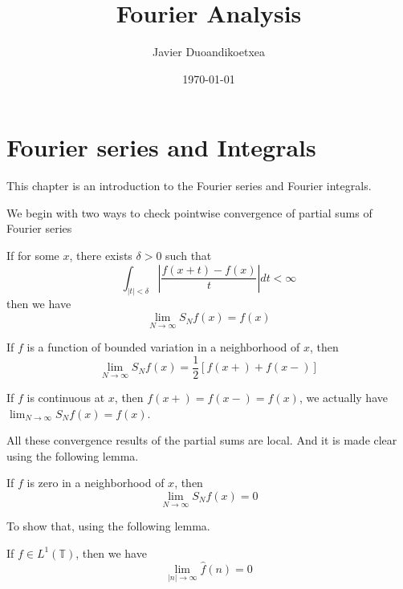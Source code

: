 \documentclass[lang=en,10pt, color=none]{elegantbook}
\title{Fourier Analysis}
\author{Javier Duoandikoetxea}
\date{\today}
\newcommand{\T}{\mathbb{T}}
\begin{document}
\maketitle
\frontmatter
\newpage

\tableofcontents
\mainmatter

\chapter{Fourier series and Integrals}
This chapter is an introduction to the Fourier series and Fourier integrals.

We begin with two ways to check pointwise convergence of partial sums of Fourier series
\begin{theorem}
    If for some $x$, there exists $\delta>0$ such that 
    \begin{equation*}
        \int_{|t|<\delta}\left|\frac{f(x+t)-f(x)}{t} \right|dt<\infty
    \end{equation*}
    then we have
    \begin{equation*}
        \lim_{N\to\infty}S_Nf(x)=f(x)
    \end{equation*}
\end{theorem}

\begin{theorem}
    If $f$ is a function of bounded variation in a neighborhood of $x$, then
    \begin{equation*}
        \lim_{N\to\infty}S_Nf(x)=\frac{1}{2}[f(x+)+f(x-)]
    \end{equation*}
\end{theorem}
\begin{remark}
    If $f$ is continuous at $x$, then $f(x+)=f(x-)=f(x)$, we actually have $\lim_{N\to\infty}S_Nf(x)=f(x)$.
\end{remark}
\begin{note}
    All these convergence results of the partial sums are local. And it is made clear using the following lemma.
\end{note}

\begin{theorem}
    If $f$ is zero in a neighborhood of $x$, then 
    \begin{equation*}
        \lim_{N\to\infty}S_Nf(x)=0
    \end{equation*}
\end{theorem}

To show that, using the following lemma.
\begin{lemma}
    If $f\in L^1(\T)$, then we have
    \begin{equation*}
        \lim_{|n|\to\infty}\hat{f}(n)=0
    \end{equation*}
\end{lemma}
\end{document}
